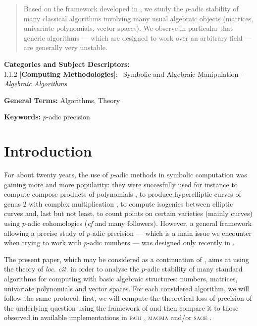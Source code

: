 \documentclass{sig-alternate}
\begin{document}
\begin{abstract}
Based on the framework developed in \cite{caruso-roe-vaccon:14a}, we study the 
$p$-adic stability of many classical algorithms involving many usual
algebraic objects (matrices, univariate polynomials,
vector spaces). We observe in particular that generic algorithms ---
which are designed to work over an arbitrary field --- are generally
very unstable.
\end{abstract}

\vspace{1mm}
 \noindent
 {\bf Categories and Subject Descriptors:} \\
\noindent I.1.2 [{\bf Computing Methodologies}]:{~} Symbolic and Algebraic
  Manipulation -- \emph{Algebraic Algorithms}

 \vspace{1mm}
 \noindent
 {\bf General Terms:} Algorithms, Theory

 \vspace{1mm}
 \noindent
 {\bf Keywords:} $p$-adic precision
\medskip

\section{Introduction}

For about twenty years, the use of $p$-adic methods in symbolic 
computation was gaining more and more popularity: they were succesfully 
used for instance 
to compute compose products of polynomials 
\cite{boston-gonzalez-perdry-schost:05a}, 
to produce hyperelliptic curves of genus $2$ with complex multiplication 
\cite{gaudry-houtmann-weng-ritzenthaler-kohel:06a},
to compute isogenies between elliptic curves \cite{lercier-sirvent:08a} 
and, last but not least,
to count points on certain varieties (mainly curves) using $p$-adic 
cohomologies (\emph{cf} \cite{kedlaya:01a,lauder:04a} and many
followers).
However, a general framework allowing a precise study of $p$-adic 
precision --- which is a main issue we encounter when trying to work 
with $p$-adic numbers --- was designed only recently in 
\cite{caruso-roe-vaccon:14a}. 

The present paper, which may be considered as a continuation of 
\cite{caruso-roe-vaccon:14a}, aims at using the theory of \emph{loc. 
cit.} in order to analyse the $p$-adic stability of many standard 
algorithms for computing with basic algebraic structures: numbers, 
matrices, univariate polynomials and vector spaces. For each considered 
algorithm, we will follow the same protocol: 
first, we will compute the theoretical loss of precision of the 
underlying question using the framework of \cite{caruso-roe-vaccon:14a} 
and then compare it to those observed in available implementations in 
\textsc{pari} \cite{pari}, \textsc{magma} \cite{magma} and/or 
\textsc{sage} \cite{sage}.
\end{document}
